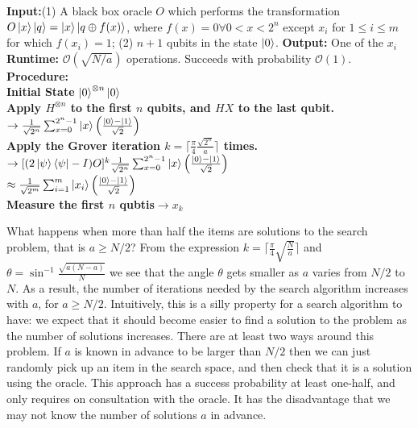 \begin{algorithm}
\caption{Grover's Algorithm}
    \begin{algorithmic}[1]
        \State \textbf{Input:}(1) A black box oracle $O$ which performs the transformation $O\ket{x}\ket{q}=\ket{x}\ket{q\oplus f(x)}$, where $f(x)=0\forall 0<x<2^n$ except $x_i$ for $1\leq i\leq m$ for which $f(x_i)=1$; (2) $n+1$ qubits in the state $\ket{0}$.
        \State \textbf{Output:} One of the $x_i$
        \State \textbf{Runtime:} $\mathcal{O}(\sqrt{N/a})$ operations. Succeeds with probability $\mathcal{O}(1)$.
        \State \textbf{Procedure:}\\
        \hspace{1em}\textbf{Initial State} $\ket{0}^{\otimes n} \ket{0}$\\
        \hspace{1em} \textbf{Apply $H^{\otimes n}$ to the first $n$ qubits, and $HX$ to the last qubit.} $\rightarrow \frac{1}{\sqrt{2^n}}\sum_{x=0}^{2^n-1}\ket{x}\left( \frac{\ket{0}-\ket{1}}{\sqrt{2}}\right)$\\
        \hspace{1em} \textbf{Apply the Grover iteration $k=\lceil \frac{\pi}{4}\frac{\sqrt{2^n}}{a}\rceil$ times.}\\
        $\rightarrow [(2\ket{\psi}\bra{\psi} -I)O]^k \frac{1}{\sqrt{2^n}}\sum_{x=0}^{2^n-1}\ket{x}\left(\frac{\ket{0}-\ket{1}}{\sqrt{2}}\right)$\\
        $\approx \frac{1}{\sqrt{2^m}}\sum_{i=1}^m \ket{x_i}\left(\frac{\ket{0}-\ket{1}}{\sqrt{2}}\right)$\\
        \hspace{1em} \textbf{Measure the first $n$ qubtis}$\rightarrow x_k$ 
    \end{algorithmic}
\end{algorithm}

What happens when more than half the items are solutions to the search problem, that is $a \geq N/2$? From the expression $k=\lceil \frac{\pi}{4}\sqrt{\frac{N}{a}}\rceil$ and $\theta=\sin^{-1}\frac{\sqrt{a(N-a)}}{N}$ we see that the angle $\theta$ gets smaller as $a$ varies from $N/2$ to $N$. As a result, the number of iterations needed by the search algorithm increases with $a$, for $a\geq N/2$. Intuitively, this is a silly property for a search algorithm to have: we expect that it should become easier to find a solution to the problem as the number of solutions increases. There are at least two ways around this problem. If $a$ is known in advance to be larger than $N/2$ then we can just randomly pick up an item in the search space, and then check that it is a solution using the oracle. This approach has a success probability at least one-half, and only requires on consultation with the oracle. It has the disadvantage that we may not know the number of solutions $a$ in advance.

